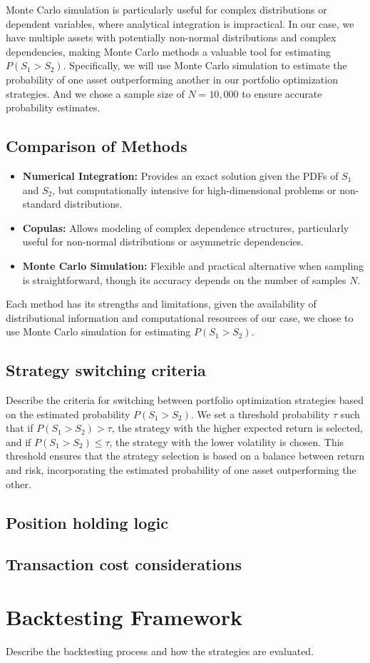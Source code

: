 Monte Carlo simulation is particularly useful for complex distributions or dependent variables, where analytical integration is impractical. In our case, we have multiple assets with potentially non-normal distributions and complex dependencies, making Monte Carlo methods a valuable tool for estimating $P(S_1 > S_2)$.
Specifically, we will use Monte Carlo simulation to estimate the probability of one asset outperforming another in our portfolio optimization strategies. And we chose a sample size of $N = 10,000$ to ensure accurate probability estimates.

\subsection{Comparison of Methods}

\begin{itemize}
    \item \textbf{Numerical Integration:} Provides an exact solution given the PDFs of $S_1$ and $S_2$, but computationally intensive for high-dimensional problems or non-standard distributions.
    \item \textbf{Copulas:} Allows modeling of complex dependence structures, particularly useful for non-normal distributions or asymmetric dependencies.
    \item \textbf{Monte Carlo Simulation:} Flexible and practical alternative when sampling is straightforward, though its accuracy depends on the number of samples $N$.
\end{itemize}

Each method has its strengths and limitations, given the availability of distributional information and computational resources of our case, we chose to use Monte Carlo simulation for estimating $P(S_1 > S_2)$.


\subsection{Strategy switching criteria}
Describe the criteria for switching between portfolio optimization strategies based on the estimated probability $P(S_1 > S_2)$.
We set a threshold probability $\tau$ such that if $P(S_1 > S_2) > \tau$, the strategy with the higher expected return is selected, and if $P(S_1 > S_2) \leq \tau$, the strategy with the lower volatility is chosen. This threshold ensures that the strategy selection is based on a balance between return and risk, incorporating the estimated probability of one asset outperforming the other.
\subsection{Position holding logic}
\subsection{Transaction cost considerations}

\section{Backtesting Framework}
Describe the backtesting process and how the strategies are evaluated.


